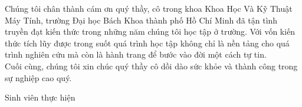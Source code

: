 \documentclass[12pt,a4paper,oneside]{book} %
\begin{document}
Chúng tôi chân thành cám ơn quý thầy, cô trong khoa Khoa Học Và Kỹ Thuật Máy Tính, trường Đại học Bách Khoa thành phố Hồ Chí Minh đã tận tình truyền đạt kiến thức trong những năm chúng tôi học tập ở trường. Với vốn kiến thức tích lũy được trong suốt quá trình học tập không chỉ là nền tảng cho quá trình nghiên cứu mà còn là hành trang để bước vào đời một cách tự tin. \\
	
Cuối cùng, chúng tôi xin chúc quý thầy cô dồi dào sức khỏe và thành công trong sự nghiệp cao quý.
\begin{flushright}
Sinh viên thực hiện
\end{flushright}
	
\tableofcontents
\listoftables
\listoffigures


\mainmatter

\fancyhead{}  %
\renewcommand{\footrulewidth}{0.4pt}

\pagestyle{fancy}  %











{}

\end{document}

